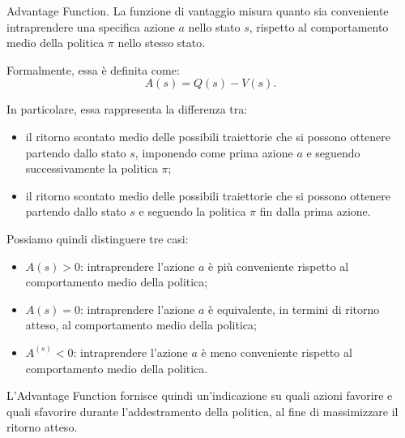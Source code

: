 \begin{definition}{Advantage Function.}
La funzione di vantaggio misura quanto sia conveniente
intraprendere una specifica azione $a$ nello stato $s$,
rispetto al comportamento medio della politica $\pi$
nello stesso stato.

Formalmente, essa è definita come:
\[
    A(s)=Q(s)-V(s).
\]

In particolare, essa rappresenta la differenza tra:
\begin{itemize}
    \item il ritorno scontato medio delle possibili traiettorie
    che si possono ottenere partendo dallo stato $s$,
    imponendo come prima azione $a$ e seguendo successivamente
    la politica $\pi$;

    \item il ritorno scontato medio delle possibili traiettorie
    che si possono ottenere partendo dallo stato $s$ e seguendo
    la politica $\pi$ fin dalla prima azione.
\end{itemize}

Possiamo quindi distinguere tre casi:
\begin{itemize}
    \item $A(s)>0$: intraprendere l'azione $a$ è
    più conveniente rispetto al comportamento medio della politica;

    \item $A(s)=0$: intraprendere l'azione $a$ è
    equivalente, in termini di ritorno atteso, al comportamento
    medio della politica;

    \item $A^(s)<0$: intraprendere l'azione $a$ è
    meno conveniente rispetto al comportamento medio della politica.
\end{itemize}

L'Advantage Function fornisce quindi un'indicazione su quali
azioni favorire e quali sfavorire durante l'addestramento
della politica, al fine di massimizzare il ritorno atteso.
\end{definition}